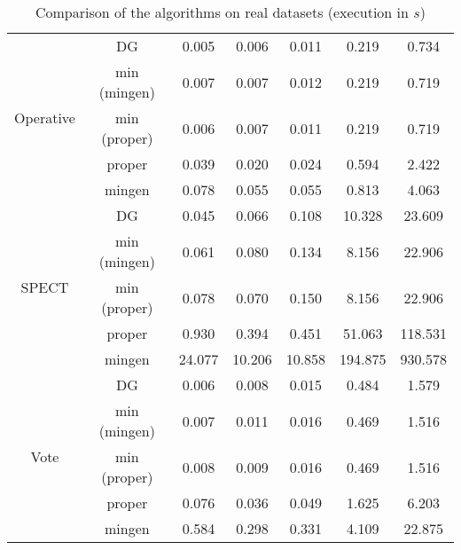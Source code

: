 \begin{table}[ht]
\begin{tabular}{| c | c || c | c | c | c | c |}
	\multirow{5}{*}{Operative} 
	& DG           & 0.005 & 0.006 & 0.011 & 0.219 & 0.734 \\
	& min (mingen) & 0.007 & 0.007 & 0.012 & 0.219 & 0.719 \\
	& min (proper) & 0.006 & 0.007 & 0.011 & 0.219 & 0.719 \\
	& proper       & 0.039 & 0.020 & 0.024 & 0.594 & 2.422 \\
	& mingen       & 0.078 & 0.055 & 0.055 & 0.813 & 4.063 \\ \hline
	
	\multirow{5}{*}{SPECT}
	& DG           & 0.045 & 0.066 & 0.108 & 10.328 & 23.609 \\
	& min (mingen) & 0.061 & 0.080 & 0.134 & 8.156 & 22.906 \\
	& min (proper) & 0.078 & 0.070 & 0.150 & 8.156 & 22.906 \\
	& proper       & 0.930 & 0.394 & 0.451 & 51.063 & 118.531 \\
	& mingen       & 24.077 & 10.206 & 10.858 & 194.875 & 930.578 \\ \hline
	
	\multirow{5}{*}{Vote}
	& DG           & 0.006 & 0.008 & 0.015 & 0.484 & 1.579 \\ 
	& min (mingen) & 0.007 & 0.011 & 0.016 & 0.469 & 1.516 \\
	& min (proper) & 0.008 & 0.009 & 0.016 & 0.469 & 1.516 \\
	& proper       & 0.076 & 0.036 & 0.049 & 1.625 & 6.203 \\
	& mingen       & 0.584 & 0.298 & 0.331 & 4.109 & 22.875 \\ \hline
	
	
\end{tabular} 
\caption{Comparison of the algorithms on real datasets (execution in $s$)}
\label{tab:real-exe}
\end{table}

